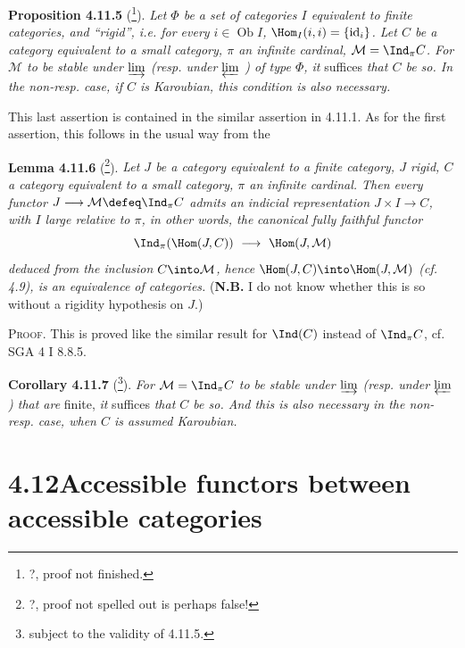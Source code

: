 \textbf{Proposition 4.11.5} (\footnote{?, proof not finished.}). \textit{Let $\Phi$ be a set of categories $I$ equivalent to finite categories, and ``rigid'', i.e. for every $i \in \operatorname{Ob} I$, $\Hom_I(i,i) = \{\mathrm{id}_i\}$. Let $C$ be a category equivalent to a small category, $\pi$ an infinite cardinal, $\mathcal{M} = \Ind_\pi C$. For $\mathcal{M}$ to be stable under $\varinjlim$ (resp. under $\varprojlim$ ) of type $\Phi$, it} suffices \textit{that $C$ be so. In the non-resp. case, if $C$ is Karoubian, this condition is also necessary.}

This last assertion is contained in the similar assertion in 4.11.1. As for the first assertion, this follows in the usual way from the

\textbf{Lemma 4.11.6} (\footnote{?, proof not spelled out is perhaps false!}). \textit{Let $J$ be a category equivalent to a finite category, $J$ rigid, $C$ a category equivalent to a small category, $\pi$ an infinite cardinal. Then every functor}
\textit{$J \longrightarrow \mathcal{M} \defeq \Ind_\pi C$ admits an indicial representation $J \times I \longrightarrow C$, with $I$ large relative to $\pi$, in other words, the}  \textit{canonical fully faithful functor}
\[
\Ind_\pi(\Hom(J,C)) \ \longrightarrow \ \Hom(J,\mathcal{M})
\]
\textit{deduced from the inclusion $C \into \mathcal{M}$, hence $\Hom(J,C) \into \Hom(J,\mathcal{M})$ (cf. 4.9), is an equivalence of categories.} (\textbf{N.B.} I do not know whether this is so without a rigidity hypothesis on $J$.)

\textsc{Proof}. This is proved like the similar result for $\Ind(C)$ instead of $\Ind_\pi C$, cf. SGA 4 I 8.8.5.


\textbf{Corollary 4.11.7} (\footnote{subject to the validity of 4.11.5.}). \textit{For $\mathcal{M} = \Ind_\pi C$ to be stable under $\varinjlim$ (resp. under $\varprojlim$ ) that are} finite, \textit{it} suffices \textit{that $C$ be so. And this is also necessary in the non-resp. case, when $C$ is assumed Karoubian.}

\section*{4.12\quad Accessible functors between accessible categories}

